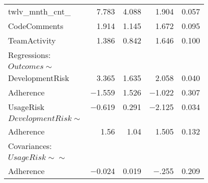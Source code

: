\begin{table}
\begin{center}
\begin{tabular}{l|rrrr}
		    twlv\_mnth\_cnt\_  &  7.783  &  4.088  &  1.904 &   0.057\\
		    CodeComments    &  1.914  &  1.145  &  1.672  &  0.095\\
		    TeamActivity    &  1.386  &  0.842 &   1.646 &   0.100\\	
			                
			Regressions:  & & & & \\  
			$Outcomes \sim$         & & & & \\                                     
			DevelopmentRisk   &  3.365 &   1.635 & 2.058 &   0.040 \\
			Adherence       &  $-$1.559  & 1.526  &  $-$1.022  &  0.307\\
			UsageRisk     &   $-0$.619  &  0.291  &  $-$2.125 &   0.034\\
			$DevelopmentRisk \sim$        & & & & \\                                  
			Adherence     &    1.56 &   1.04  &  1.505 &   0.132\\
			Covariances:  & & & & \\  
			$UsageRisk \sim\sim$          & & & & \\                                 
			Adherence     &    $-$0.024 &   0.019  &  $-$.255 &   0.209\\
		\end{tabular}
	\end{center}
\end{table}


